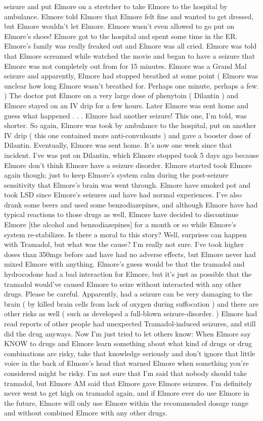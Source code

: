 \documentclass[12pt]{book}
\begin{document}
seizure and put Elmore on a stretcher to take Elmore to the hospital by ambulance. Elmore told Elmore that Elmore felt fine and wanted to get dressed, but Elmore wouldn't let Elmore. Elmore wasn't even allowed to go put on Elmore's shoes! Elmore got to the hospital and spent some time in the ER. Elmore's family was really freaked out and Elmore was all cried. Elmore was told that Elmore screamed while watched the movie and began to have a seizure that Elmore was not completely out from for 15 minutes. Elmore was a Grand Mal seizure and apparently, Elmore had stopped breathed at some point ( Elmore was unclear how long Elmore wasn't breathed for. Perhaps one minute, perhaps a few. ) The doctor put Elmore on a very large dose of phenytoin ( Dilantin ) and Elmore stayed on an IV drip for a few hours. Later Elmore was sent home and guess what happened . . .  Elmore had another seizure! This one, I'm told, was shorter. So again, Elmore was took by ambulance to the hospital, put on another IV drip ( this one contained more anti-convulsants ) and gave a booster dose of Dilantin. Eventually, Elmore was sent home. It's now one week since that incident. I've was put on Dilantin, which Elmore stopped took 5 days ago because Elmore don't think Elmore have a seizure disorder. Elmore started took Elmore again though; just to keep Elmore's system calm during the post-seizure sensitivity that Elmore's brain was went through. Elmore have smoked pot and took LSD since Elmore's seizures and have had normal experiences. I've also drank some beers and used some benzodiazepines, and although Elmore have had typical reactions to those drugs as well, Elmore have decided to discontinue Elmore [the alcohol and benzodiazepines] for a month or so while Elmore's system re-stabilizes. Is there a moral to this story? Well, surprises can happen with Tramadol, but what was the cause? I'm really not sure. I've took higher doses than 350mgs before and have had no adverse effects, but Elmore never had mixed Elmore with anything. Elmore's guess would be that the tramadol and hydrocodone had a bad interaction for Elmore, but it's just as possible that the tramadol would've caused Elmore to seize without interacted with any other drugs. Please be careful. Apparently, had a seizure can be very damaging to the brain ( by killed brain cells from lack of oxygen during suffocation ) and there are other risks as well ( such as developed a full-blown seizure-disorder. ) Elmore had read reports of other people had unexpected Tramadol-induced seizures, and still did the drug anyways. Now I'm just tried to let others know: When Elmore say KNOW to drugs and Elmore learn something about what kind of drugs or drug combinations are risky, take that knowledge seriously and don't ignore that little voice in the back of Elmore's head that warned Elmore when something you're considered might be risky. I'm not sure that I'm said that nobody should take tramadol, but Elmore AM said that Elmore gave Elmore seizures. I'm definitely never went to get high on tramadol again, and if Elmore ever do use Elmore in the future, Elmore will only use Elmore within the recommended dosage range and without combined Elmore with any other drugs.
\end{document}
